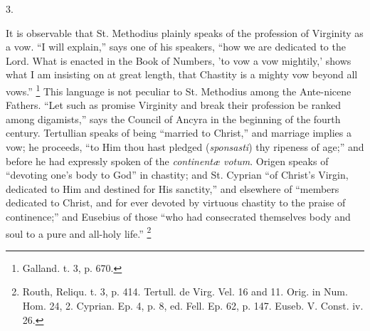 3.

It is observable that St. Methodius plainly speaks of the
profession of Virginity as a vow. ``I will explain,'' says one
of his speakers, ``how we are dedicated to the Lord. What is
enacted in the Book of Numbers, 'to vow a vow mightily,' shows what I
am insisting on at great length, that Chastity is a mighty vow beyond
all vows.'' \footnote{Galland. t. 3, p. 670.} This
language is not peculiar to St. Methodius among the Ante-nicene
Fathers. ``Let such as promise Virginity and break their
profession be ranked among digamists,'' says the Council of Ancyra
in the beginning of the fourth century. Tertullian speaks of being
``married to Christ,'' and marriage implies a vow; he
proceeds, ``to Him thou hast pledged (\emph{sponsasti}) thy
ripeness of age;'' and before he had expressly spoken of the \emph{continentæ
votum}. Origen speaks of ``devoting one's body to God'' in
chastity; and St. Cyprian ``of Christ's Virgin, dedicated to Him
and destined for His sanctity,'' and elsewhere of ``members
dedicated to Christ, and for ever devoted by virtuous chastity to the
praise of continence;'' and Eusebius of those ``who had
consecrated themselves body and soul to a pure and all-holy
life.'' \footnote{Routh, Reliqu. t. 3, p. 414. Tertull. de
Virg. Vel. 16 and 11. Orig. in Num. Hom. 24, 2. Cyprian. Ep. 4, p. 8,
ed. Fell. Ep. 62, p. 147. Euseb. V. Const. iv. 26.}


